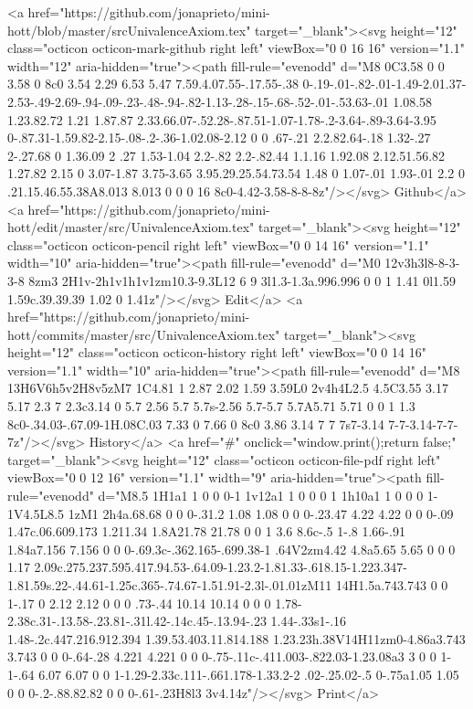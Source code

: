       <a href="https://github.com/jonaprieto/mini-hott/blob/master/srcUnivalenceAxiom.tex" target="_blank"><svg height="12" class="octicon octicon-mark-github right left" viewBox="0 0 16 16" version="1.1" width="12" aria-hidden="true"><path fill-rule="evenodd" d="M8 0C3.58 0 0 3.58 0 8c0 3.54 2.29 6.53 5.47 7.59.4.07.55-.17.55-.38 0-.19-.01-.82-.01-1.49-2.01.37-2.53-.49-2.69-.94-.09-.23-.48-.94-.82-1.13-.28-.15-.68-.52-.01-.53.63-.01 1.08.58 1.23.82.72 1.21 1.87.87 2.33.66.07-.52.28-.87.51-1.07-1.78-.2-3.64-.89-3.64-3.95 0-.87.31-1.59.82-2.15-.08-.2-.36-1.02.08-2.12 0 0 .67-.21 2.2.82.64-.18 1.32-.27 2-.27.68 0 1.36.09 2 .27 1.53-1.04 2.2-.82 2.2-.82.44 1.1.16 1.92.08 2.12.51.56.82 1.27.82 2.15 0 3.07-1.87 3.75-3.65 3.95.29.25.54.73.54 1.48 0 1.07-.01 1.93-.01 2.2 0 .21.15.46.55.38A8.013 8.013 0 0 0 16 8c0-4.42-3.58-8-8-8z"/></svg> Github</a>
      <a href="https://github.com/jonaprieto/mini-hott/edit/master/src/UnivalenceAxiom.tex" target="_blank"><svg height="12" class="octicon octicon-pencil right left" viewBox="0 0 14 16" version="1.1" width="10" aria-hidden="true"><path fill-rule="evenodd" d="M0 12v3h3l8-8-3-3-8 8zm3 2H1v-2h1v1h1v1zm10.3-9.3L12 6 9 3l1.3-1.3a.996.996 0 0 1 1.41 0l1.59 1.59c.39.39.39 1.02 0 1.41z"/></svg> Edit</a>
      <a href="https://github.com/jonaprieto/mini-hott/commits/master/src/UnivalenceAxiom.tex" target="_blank"><svg height="12" class="octicon octicon-history right left" viewBox="0 0 14 16" version="1.1" width="10" aria-hidden="true"><path fill-rule="evenodd" d="M8 13H6V6h5v2H8v5zM7 1C4.81 1 2.87 2.02 1.59 3.59L0 2v4h4L2.5 4.5C3.55 3.17 5.17 2.3 7 2.3c3.14 0 5.7 2.56 5.7 5.7s-2.56 5.7-5.7 5.7A5.71 5.71 0 0 1 1.3 8c0-.34.03-.67.09-1H.08C.03 7.33 0 7.66 0 8c0 3.86 3.14 7 7 7s7-3.14 7-7-3.14-7-7-7z"/></svg> History</a>
      <a  href="#" onclick="window.print();return false;" target="_blank"><svg height="12" class="octicon octicon-file-pdf right left" viewBox="0 0 12 16" version="1.1" width="9" aria-hidden="true"><path fill-rule="evenodd" d="M8.5 1H1a1 1 0 0 0-1 1v12a1 1 0 0 0 1 1h10a1 1 0 0 0 1-1V4.5L8.5 1zM1 2h4a.68.68 0 0 0-.31.2 1.08 1.08 0 0 0-.23.47 4.22 4.22 0 0 0-.09 1.47c.06.609.173 1.211.34 1.8A21.78 21.78 0 0 1 3.6 8.6c-.5 1-.8 1.66-.91 1.84a7.156 7.156 0 0 0-.69.3c-.362.165-.699.38-1 .64V2zm4.42 4.8a5.65 5.65 0 0 0 1.17 2.09c.275.237.595.417.94.53-.64.09-1.23.2-1.81.33-.618.15-1.223.347-1.81.59s.22-.44.61-1.25c.365-.74.67-1.51.91-2.3l-.01.01zM11 14H1.5a.743.743 0 0 1-.17 0 2.12 2.12 0 0 0 .73-.44 10.14 10.14 0 0 0 1.78-2.38c.31-.13.58-.23.81-.31l.42-.14c.45-.13.94-.23 1.44-.33s1-.16 1.48-.2c.447.216.912.394 1.39.53.403.11.814.188 1.23.23h.38V14H11zm0-4.86a3.743 3.743 0 0 0-.64-.28 4.221 4.221 0 0 0-.75-.11c-.411.003-.822.03-1.23.08a3 3 0 0 1-1-.64 6.07 6.07 0 0 1-1.29-2.33c.111-.661.178-1.33.2-2 .02-.25.02-.5 0-.75a1.05 1.05 0 0 0-.2-.88.82.82 0 0 0-.61-.23H8l3 3v4.14z"/></svg> Print</a>
